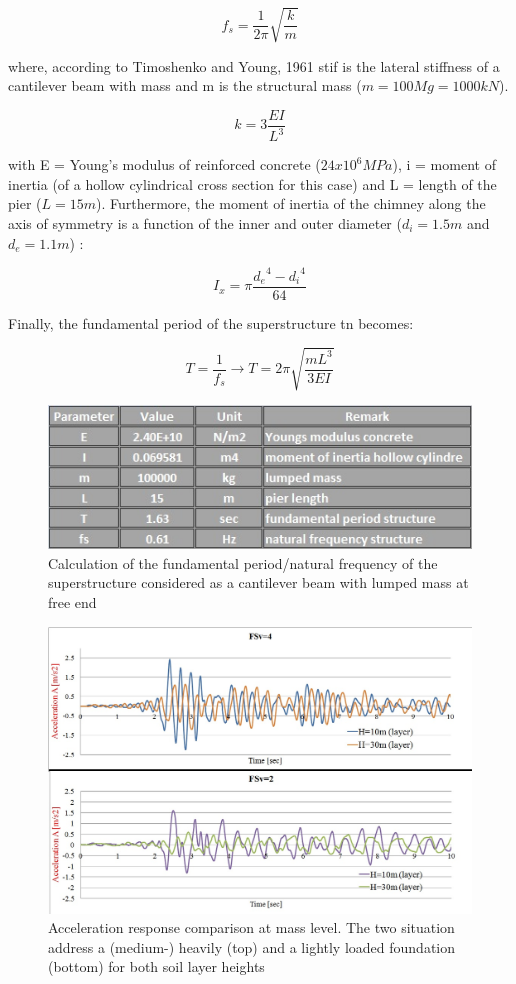 \begin{equation}
	f_s=\frac{1}{2 \pi} \sqrt{\frac{k}{m}}
\end{equation}

where, according to Timoshenko and Young, 1961 \gls{stif} is the lateral stiffness of a cantilever beam with mass and m is the structural mass ($m=100 Mg=1000 kN$).

\begin{equation}
	k=3\frac{EI}{L^3}
\end{equation}

with E = Young's modulus of reinforced concrete ($24x10^6 MPa$), \gls{i} = moment of inertia (of a hollow cylindrical cross section for this case) and L = length of the pier ($L=15m$). Furthermore, the moment of inertia of the chimney along the axis of symmetry is a function of the inner and outer diameter ($d_i=1.5m$ and $d_e=1.1m$) :
 
\begin{equation}
	I_x=\pi \frac{{d_e}^4-{d_i}^4}{64}
\end{equation}

Finally, the fundamental period of the superstructure \gls{tn} becomes:

\begin{equation}
	T=\frac{1}{f_s} \longrightarrow T=2 \pi \sqrt{\frac{mL^3}{3EI}}
\end{equation}

\begin{figure}[h]
	\centering
	\includegraphics[width=0.7 \linewidth]{"fundamental"}
	\caption{Calculation of the fundamental period/natural frequency of the superstructure considered as a cantilever beam with lumped mass at free end}
	\label{fundam}
\end{figure}

 \begin{figure}[h]
 	\centering
 	\includegraphics[width=0.7 \linewidth]{"acc_10m"}
 	\caption{Acceleration response comparison at mass level. The two situation address a (medium-) heavily (top) and a lightly loaded foundation (bottom) for both soil layer heights}
 	\label{10}
 \end{figure}

